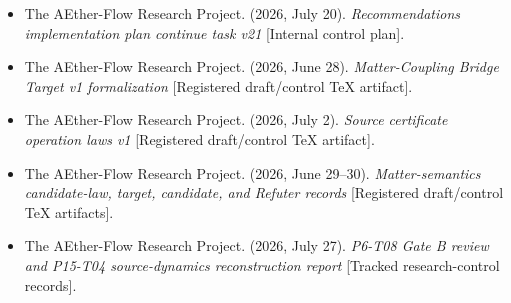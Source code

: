 \documentclass[11pt]{article}
\begin{document}
\begin{itemize}[leftmargin=*]
\item The AEther-Flow Research Project. (2026, July 20).
  \emph{Recommendations implementation plan continue task v21}
  [Internal control plan].
\item The AEther-Flow Research Project. (2026, June 28).
  \emph{Matter-Coupling Bridge Target v1 formalization}
  [Registered draft/control TeX artifact].
\item The AEther-Flow Research Project. (2026, July 2).
  \emph{Source certificate operation laws v1}
  [Registered draft/control TeX artifact].
\item The AEther-Flow Research Project. (2026, June 29--30).
  \emph{Matter-semantics candidate-law, target, candidate, and Refuter
  records} [Registered draft/control TeX artifacts].
\item The AEther-Flow Research Project. (2026, July 27).
  \emph{P6-T08 Gate B review and P15-T04 source-dynamics reconstruction
  report} [Tracked research-control records].
\end{itemize}
\end{document}
